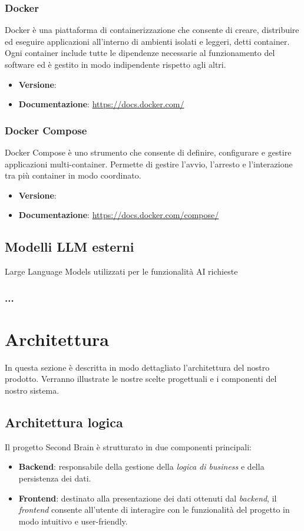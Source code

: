 \documentclass[a4paper,10pt]{article}
\begin{document}
\subsubsection{Docker}
Docker è una piattaforma di containerizzazione che consente di creare, distribuire ed eseguire applicazioni all’interno di ambienti isolati e leggeri, detti container. Ogni container include tutte le dipendenze necessarie al funzionamento del software ed è gestito in modo indipendente rispetto agli altri.
\begin{itemize}
    \item \textbf{Versione}:
    \item \textbf{Documentazione}: \url{https://docs.docker.com/}
\end{itemize}

\subsubsection{Docker Compose}
Docker Compose è uno strumento che consente di definire, configurare e gestire applicazioni multi-container. Permette di gestire l’avvio, l’arresto e l’interazione tra più container in modo coordinato.
\begin{itemize}
    \item \textbf{Versione}:
    \item \textbf{Documentazione}: \url{https://docs.docker.com/compose/}
\end{itemize}

\subsection{Modelli LLM esterni}
Large Language Models utilizzati per le funzionalità AI richieste

\subsubsection{...}

\newpage

\section{Architettura}
In questa sezione è descritta in modo dettagliato l'architettura del nostro prodotto. Verranno illustrate le nostre scelte progettuali e i componenti del nostro sistema.

\subsection{Architettura logica}
Il progetto Second Brain è strutturato in due componenti principali:
\begin{itemize}
    \item \textbf{Backend}: responsabile della gestione della \textit{logica di business} e della persistenza dei dati.
    \item \textbf{Frontend}: destinato alla presentazione dei dati ottenuti dal \textit{backend}, il \textit{frontend} consente all'utente di interagire con le funzionalità del progetto in modo intuitivo e user-friendly.
\end{itemize}
\end{document}
